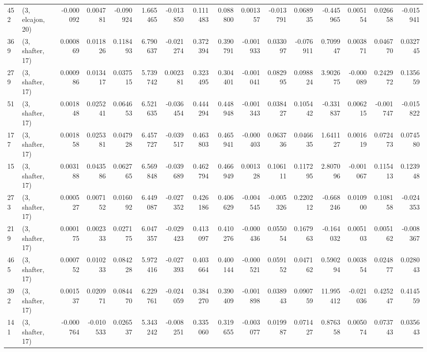 \begin{tabular}{llrrrrrrrrrrrrrr}
452 &  (3, elcajon, 20) &  -0.000092 &  0.004781 & -0.090924 &    1.665465 & -0.013850 &   0.111483 &  0.088800 &  0.001357 & -0.013791 &  0.068935 &   -0.445965 &  0.005154 &  0.026658 & -0.015941 \\
369 &  (3, shafter, 17) &   0.000869 &  0.011826 &  0.118493 &    6.790637 & -0.021274 &   0.372394 &  0.390791 & -0.001933 &  0.033097 & -0.076911 &    0.709947 &  0.003871 &  0.046770 &  0.032745 \\
279 &  (3, shafter, 17) &   0.000986 &  0.013417 &  0.037515 &    5.739742 &  0.002381 &   0.323495 &  0.304401 & -0.001041 &  0.082995 &  0.098824 &    3.902675 & -0.000089 &  0.242972 &  0.135659 \\
51  &  (3, shafter, 17) &   0.001848 &  0.025241 &  0.064653 &    6.521635 & -0.036454 &   0.444294 &  0.448948 & -0.001343 &  0.038427 &  0.105442 &   -0.331837 &  0.006215 & -0.001747 & -0.015822 \\
177 &  (3, shafter, 17) &   0.001858 &  0.025381 &  0.047928 &    6.457727 & -0.039517 &   0.463803 &  0.465941 & -0.000403 &  0.063736 &  0.046635 &    1.641127 &  0.001619 &  0.072473 &  0.074580 \\
15  &  (3, shafter, 17) &   0.003188 &  0.043586 &  0.062765 &    6.569848 & -0.039689 &   0.462794 &  0.466949 &  0.001328 &  0.106111 &  0.117295 &    2.807096 & -0.001067 &  0.115413 &  0.123948 \\
273 &  (3, shafter, 17) &   0.000527 &  0.007152 &  0.016092 &    6.449087 & -0.027352 &   0.426186 &  0.406629 & -0.004545 & -0.005326 &  0.220212 &   -0.668246 &  0.010900 &  0.108158 & -0.024353 \\
219 &  (3, shafter, 17) &   0.000175 &  0.002333 &  0.027175 &    6.047357 & -0.029423 &   0.413097 &  0.410276 & -0.000436 &  0.055054 &  0.167963 &   -0.164032 &  0.005103 &  0.005162 & -0.008367 \\
465 &  (3, shafter, 17) &   0.000752 &  0.010233 &  0.084228 &    5.972416 & -0.027393 &   0.403664 &  0.400144 & -0.000521 &  0.059152 &  0.047162 &    0.590294 &  0.003854 &  0.024877 &  0.028043 \\
392 &  (3, shafter, 17) &   0.001537 &  0.020971 &  0.084470 &    6.229761 & -0.024059 &   0.384270 &  0.390409 & -0.001898 &  0.038943 &  0.090759 &   11.995412 & -0.021036 &  0.425247 &  0.414559 \\
141 &  (3, shafter, 17) &  -0.000764 & -0.010533 &  0.026537 &    5.343242 & -0.008251 &   0.335060 &  0.319655 & -0.003077 &  0.019987 &  0.071427 &    0.876358 &  0.005074 &  0.073743 &  0.035643 \\

\end{tabular}
